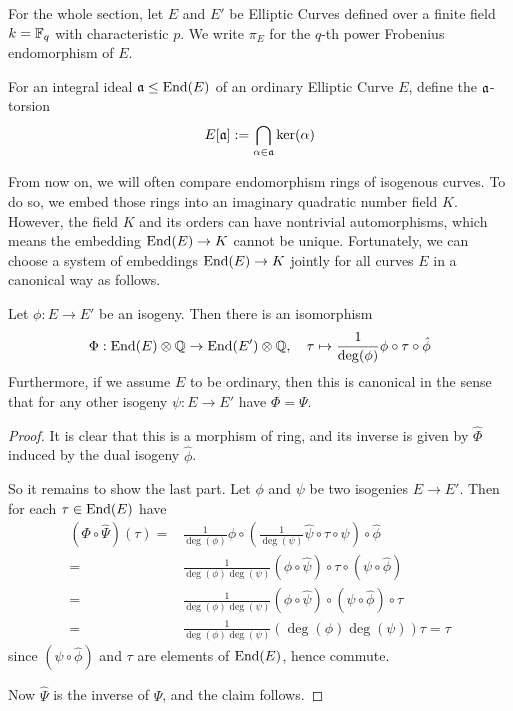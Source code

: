 For the whole section, let $E$ and $E'$ be Elliptic Curves defined over a finite field $k = \mathbb{F}_q$ with characteristic $p$.
We write $\pi_E$ for the $q$-th power Frobenius endomorphism of $E$.
\begin{definition}
    For an integral ideal $\mathfrak{a} \leq \mathrm{End}(E)$ of an ordinary Elliptic Curve $E$, define the $\mathfrak{a}$-torsion
    \begin{equation*}
        E[\mathfrak{a}] := \bigcap_{\alpha \in \mathfrak{a}} \ker(\alpha)
    \end{equation*}
\end{definition}
From now on, we will often compare endomorphism rings of isogenous curves.
To do so, we embed those rings into an imaginary quadratic number field $K$.
However, the field $K$ and its orders can have nontrivial automorphisms, which means the embedding $\mathrm{End}(E) \to K$ cannot be unique.
Fortunately, we can choose a system of embeddings $\mathrm{End}(E) \to K$ jointly for all curves $E$ in a canonical way as follows.
\begin{lemma}
    Let $\phi: E \to E'$ be an isogeny.
    Then there is an isomorphism
    \begin{equation*}
        \Phi: \mathrm{End}(E) \otimes \mathbb{Q} \to \mathrm{End}(E') \otimes \mathbb{Q}, \quad \tau \mapsto \frac 1 {\deg(\phi)} \phi \circ \tau \circ \hat{\phi}
    \end{equation*}
    Furthermore, if we assume $E$ to be ordinary, then this is canonical in the sense that for any other isogeny $\psi: E \to E'$ have $\Phi = \Psi$.
\end{lemma}
\begin{proof}
    It is clear that this is a morphism of ring, and its inverse is given by $\hat{\Phi}$ induced by the dual isogeny $\hat{\phi}$.
    
    So it remains to show the last part.
    Let $\phi$ and $\psi$ be two isogenies $E \to E'$.
    Then for each $\tau \in \mathrm{End}(E)$ have
    \begin{align*}
        (\Phi \circ \hat{\Psi})(\tau) =& \frac 1 { \deg(\phi) } \phi \circ \left( \frac 1 {\deg(\psi)} \hat{\psi} \circ \tau \circ \psi \right) \circ \hat{\phi} \\
        =& \frac 1 { \deg(\phi)\deg(\psi) } (\phi \circ \hat{\psi}) \circ \tau \circ (\psi \circ \hat{\phi}) \\
        =& \frac 1 { \deg(\phi)\deg(\psi) } (\phi \circ \hat{\psi}) \circ (\psi \circ \hat{\phi}) \circ \tau \\
        =& \frac 1 { \deg(\phi)\deg(\psi) } (\deg(\phi) \deg(\psi)) \tau = \tau
    \end{align*}
    since $(\psi \circ \hat{\phi})$ and $\tau$ are elements of $\mathrm{End}(E)$, hence commute.

    Now $\hat{\Psi}$ is the inverse of $\Psi$, and the claim follows.
\end{proof}
